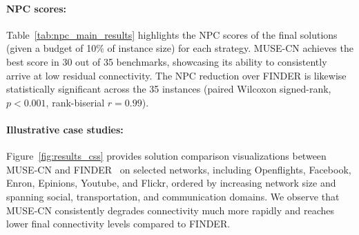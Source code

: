 \documentclass{article}
\begin{document}
\paragraph{NPC scores:} Table~\ref{tab:npc_main_results} highlights the NPC scores of the final solutions (given a budget of 10\% of instance size) for each strategy. MUSE-CN achieves the best score in 30 out of 35 benchmarks, showcasing its ability to consistently arrive at low residual connectivity. The NPC reduction over FINDER is likewise statistically significant across the 35 instances (paired Wilcoxon signed-rank, $p < 0.001$, rank-biserial $r = 0.99$).



\paragraph{Illustrative case studies:} Figure~\ref{fig:results_css} provides solution comparison visualizations between MUSE-CN and FINDER~\cite{fan2020finding} on selected networks, including Openflights, Facebook, Enron, Epinions, Youtube, and Flickr, ordered by increasing network size and spanning social, transportation, and communication domains. We observe that MUSE-CN consistently degrades connectivity much more rapidly and reaches lower final connectivity levels compared to FINDER.
\end{document}

